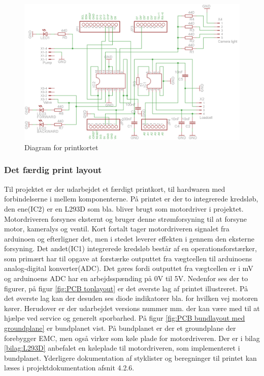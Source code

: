 \begin{figure}[H]
	\centering
	\includegraphics[width=1\textwidth]{billeder/Hovedrapport/Diagram.png}
	\caption{Diagram for printkortet}
	\label{fig:PCBdiagram}
\end{figure}

\newpage

\subsubsection{Det færdig print layout}
Til projektet er der udarbejdet et færdigt printkort, til hardwaren med forbindelserne i mellem komponenterne. På printet er der to integrerede kredsløb, den ene(IC2) er en L293D som bla. bliver brugt som motordriver i projektet. Motordriveren forsynes eksternt og bruger denne strømforsyning til at forsyne motor, kameralys og ventil. Kort fortalt tager motordriveren signalet fra arduinoen og efterligner det, men i stedet leverer effekten i gennem den eksterne forsyning. Det andet(IC1) integrerede kredsløb består af en operationsforstærker, som primært har til opgave at forstærke outputtet fra vægtcellen til arduinoens analog-digital konverter(ADC). Det gøres fordi outputtet fra vægtcellen er i mV og arduinoens ADC har en arbejdsspænding på 0V til 5V. Nedenfor ses der to figurer, på figur \ref{fig:PCB toplayout} er det øverste lag af printet illustreret. På det øverste lag kan der desuden ses diode indikatorer bla. for hvilken vej motoren kører. Herudover er der udarbejdet versions nummer mm. der kan være med til at hjælpe ved service og generelt sporbarhed. På figur \ref{fig:PCB bundlayout med groundplane} er bundplanet vist. På bundplanet er der et groundplane der forebygger EMC, men også virker som køle plade for motordriveren. Der er i bilag \ref{bilag:L293D} anbefalet en køleplade til motordriveren, som implementeret i bundplanet. Yderligere dokumentation af styklister og beregninger til printet kan læses i projektdokumentation afsnit 4.2.6. 

